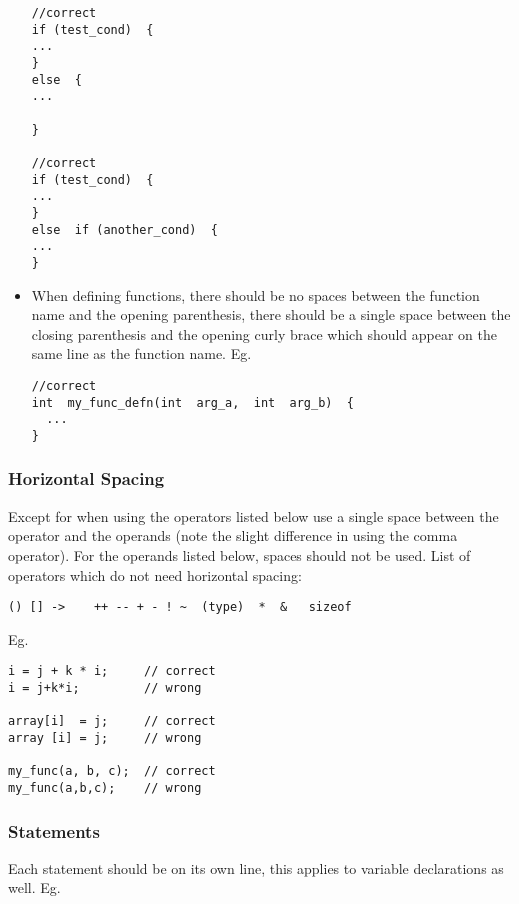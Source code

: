 \begin{itemize}
\smallskip
\begin{lstlisting}
//correct
if (test_cond)  {
...
}
else  {
...

}

//correct
if (test_cond)  {
...
}
else  if (another_cond)  {
...
}
\end{lstlisting}
\smallskip

  \item When defining functions, there should be no spaces between the
function name and the opening parenthesis, there should be a single
space between the closing parenthesis and the opening curly brace which
should appear on the same line as the function name.  Eg.

\smallskip
\begin{lstlisting}
//correct
int  my_func_defn(int  arg_a,  int  arg_b)  {
  ...
}
\end{lstlisting}
\smallskip
\end{itemize}


\subsubsection{Horizontal Spacing}

Except for when using the operators listed below use a single space
between the operator and the operands (note the slight difference in
using the comma operator).  For the operands listed below, spaces
should not be used.  List of operators which do not need horizontal
spacing:

\smallskip
\begin{lstlisting}
() [] ->    ++ -- + - ! ~  (type)  *  &   sizeof
\end{lstlisting}
\smallskip

Eg.

\smallskip
\begin{lstlisting}
i = j + k * i;     // correct 
i = j+k*i;         // wrong

array[i]  = j;     // correct 
array [i] = j;     // wrong

my_func(a, b, c);  // correct 
my_func(a,b,c);    // wrong
\end{lstlisting}
\smallskip



\subsubsection{Statements}

Each statement should be on its own line, this applies to variable
declarations as well. Eg.

